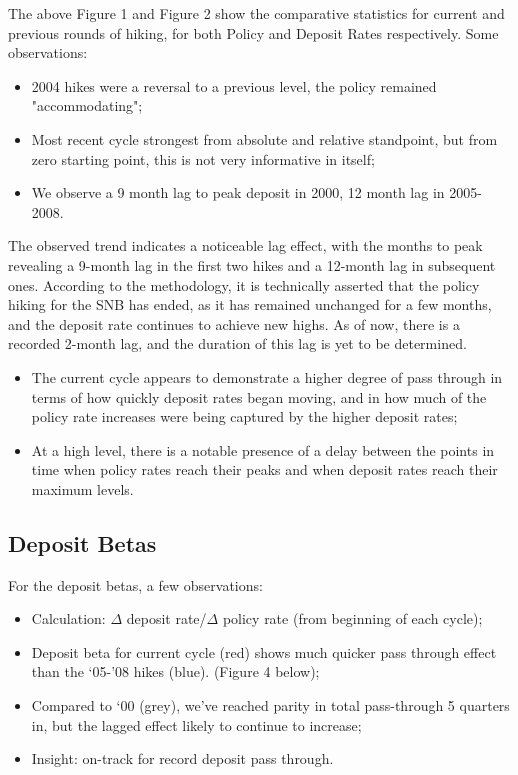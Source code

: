 \documentclass{article}
\begin{document}
The above Figure 1 and Figure 2 show the comparative statistics for current and previous rounds of hiking, for both Policy and Deposit Rates respectively. Some observations:

\begin{itemize}
    \item 2004 hikes were a reversal to a previous level, the policy remained "accommodating";
    \item Most recent cycle strongest from absolute and relative standpoint, but from zero starting point, this is not very informative in itself;
    \item We observe a 9 month lag to peak deposit in 2000, 12 month lag in 2005-2008. 
\end{itemize}

The observed trend indicates a noticeable lag effect, with the months to peak revealing a 9-month lag in the first two hikes and a 12-month lag in subsequent ones. According to the methodology, it is technically asserted that the policy hiking for the SNB has ended, as it has remained unchanged for a few months, and the deposit rate continues to achieve new highs. As of now, there is a recorded 2-month lag, and the duration of this lag is yet to be determined.
\\

\begin{itemize}
    \item The current cycle appears to demonstrate a higher degree of pass through in
terms of how quickly deposit rates began moving, and in how much of the
policy rate increases were being captured by the higher deposit rates;
    \item At a high level, there is a notable presence of a delay between the points in time when policy rates reach their peaks and when deposit rates reach their maximum levels.
\end{itemize}

\subsection{Deposit Betas}

For the deposit betas, a few observations:

\begin{itemize}
    \item Calculation: $\Delta$ deposit rate/$\Delta$ policy rate  (from beginning of each cycle);
    \item Deposit beta for current cycle (red) shows much quicker pass through effect than the ‘05-’08 hikes (blue). (Figure 4 below);
    \item Compared to ‘00 (grey), we’ve reached parity in total pass-through 5 quarters in, but the lagged effect likely to continue to increase;
    \item Insight: on-track for record deposit pass through. 
\end{itemize}
\end{document}
